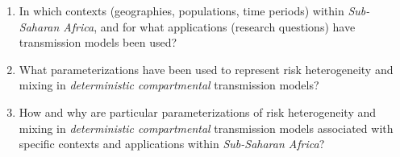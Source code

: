 \begin{enumerate}
  \item\label{q:context}
  In which contexts (geographies, populations, time periods)
  within \emph{Sub-Saharan Africa}, and
  for what applications (research questions)
  have \hiv transmission models been used?
  \item\label{q:hetero}
  What parameterizations have been used
  to represent risk heterogeneity and mixing
  in \emph{deterministic compartmental} \hiv transmission models?
  \item\label{q:trends}
  How and why are particular parameterizations of risk heterogeneity and mixing
  in \emph{deterministic compartmental} \hiv transmission models
  associated with specific contexts and applications within \emph{Sub-Saharan Africa}?
\end{enumerate}